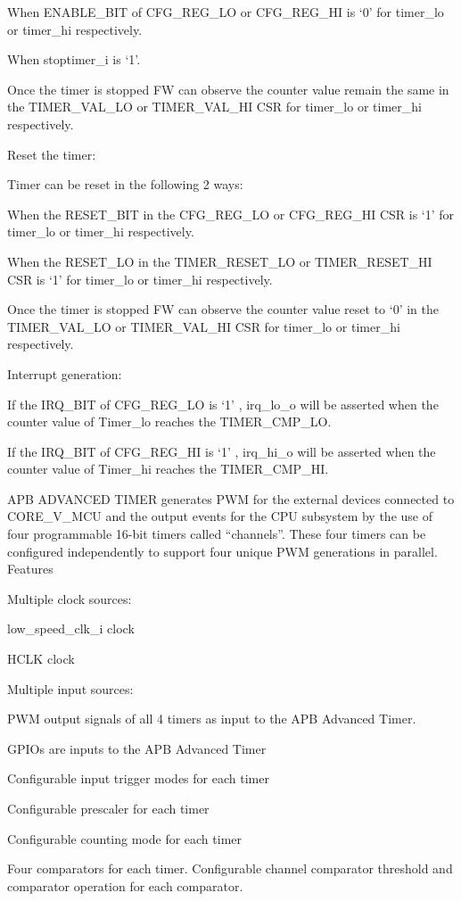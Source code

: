             When ENABLE_BIT of CFG_REG_LO or CFG_REG_HI is ‘0’ for timer_lo or timer_hi respectively.

            When stoptimer_i is ‘1’.

    Once the timer is stopped FW can observe the counter value remain the same in the TIMER_VAL_LO or TIMER_VAL_HI CSR for timer_lo or timer_hi respectively.

Reset the timer:

    Timer can be reset in the following 2 ways:

            When the RESET_BIT in the CFG_REG_LO or CFG_REG_HI CSR is ‘1’ for timer_lo or timer_hi respectively.

            When the RESET_LO in the TIMER_RESET_LO or TIMER_RESET_HI CSR is ‘1’ for timer_lo or timer_hi respectively.

    Once the timer is stopped FW can observe the counter value reset to ‘0’ in the TIMER_VAL_LO or TIMER_VAL_HI CSR for timer_lo or timer_hi respectively.

Interrupt generation:

    If the IRQ_BIT of CFG_REG_LO is ‘1’ , irq_lo_o will be asserted when the counter value of Timer_lo reaches the TIMER_CMP_LO.

    If the IRQ_BIT of CFG_REG_HI is ‘1’ , irq_hi_o will be asserted when the counter value of Timer_hi reaches the TIMER_CMP_HI.

    APB ADVANCED TIMER generates PWM for the external devices connected to CORE_V_MCU and the output events for the CPU subsystem by the use of four programmable 16-bit timers called “channels”. These four timers can be configured independently to support four unique PWM generations in parallel.
Features

    Multiple clock sources:

        low_speed_clk_i clock

        HCLK clock

    Multiple input sources:

        PWM output signals of all 4 timers as input to the APB Advanced Timer.

        GPIOs are inputs to the APB Advanced Timer

    Configurable input trigger modes for each timer

    Configurable prescaler for each timer

    Configurable counting mode for each timer

    Four comparators for each timer. Configurable channel comparator threshold and comparator operation for each comparator.

